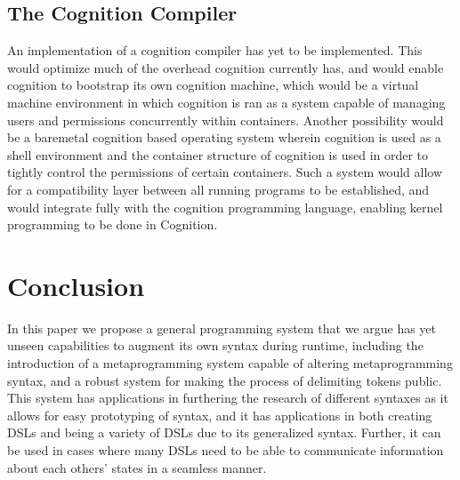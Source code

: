 \documentclass[
	letterpaper,
	10pt,
	twoside,
]{LTJournalArticle}
\begin{document}
\subsection{The Cognition Compiler}
An implementation of a cognition compiler has yet to be implemented. This would optimize much of the
overhead cognition currently has, and would enable cognition to bootstrap its own cognition machine, which would be a virtual
machine environment in which cognition is ran as a system capable of managing users and permissions concurrently within
containers. Another possibility would be a baremetal cognition based operating system wherein cognition is used as a shell
environment and the container structure of cognition is used in order to tightly control the permissions of certain containers.
Such a system would allow for a compatibility layer between all running programs to be established, and would integrate fully
with the cognition programming language, enabling kernel programming to be done in Cognition.

\section{Conclusion}
In this paper we propose a general programming system that we argue has yet unseen capabilities to augment its own syntax
during runtime, including the introduction of a metaprogramming system capable of altering metaprogramming syntax, and a
robust system for making the process of delimiting tokens public. This system has applications in furthering the research
of different syntaxes as it allows for easy prototyping of syntax, and it has applications in both creating DSLs and
being a variety of DSLs due to its generalized syntax. Further, it can be used in cases where many DSLs need to be able
to communicate information about each others' states in a seamless manner.

\printbibliography
\end{document}
